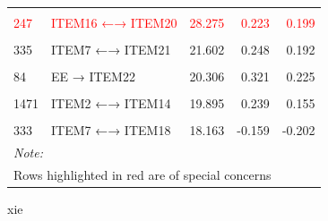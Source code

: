 \documentclass[
]{article}
\begin{document}
\begin{table}
\begin{tabular}[t]{llrrr}
\hspace{1em}\textcolor{red}{\cellcolor{gray!6}{339}} & \textcolor{red}{\cellcolor{gray!6}{ITEM9 ←→ ITEM19}} & \textcolor{red}{\cellcolor{gray!6}{42.687}} & \textcolor{red}{\cellcolor{gray!6}{0.351}} & \textcolor{red}{\cellcolor{gray!6}{0.355}}\\
\hspace{1em}\textcolor{red}{247} & \textcolor{red}{ITEM16 ←→ ITEM20} & \textcolor{red}{28.275} & \textcolor{red}{0.223} & \textcolor{red}{0.199}\\
\hspace{1em}\cellcolor{gray!6}{345} & \cellcolor{gray!6}{ITEM17 ←→ ITEM18} & \cellcolor{gray!6}{21.951} & \cellcolor{gray!6}{0.148} & \cellcolor{gray!6}{0.221}\\
\hspace{1em}335 & ITEM7 ←→ ITEM21 & 21.602 & 0.248 & 0.192\\
\hspace{1em}\cellcolor{gray!6}{346} & \cellcolor{gray!6}{ITEM17 ←→ ITEM19} & \cellcolor{gray!6}{20.837} & \cellcolor{gray!6}{-0.160} & \cellcolor{gray!6}{-0.218}\\
\hspace{1em}84 & EE → ITEM22 & 20.306 & 0.321 & 0.225\\
\hspace{1em}\cellcolor{gray!6}{981} & \cellcolor{gray!6}{DP → ITEM14} & \cellcolor{gray!6}{20.142} & \cellcolor{gray!6}{-0.404} & \cellcolor{gray!6}{-0.210}\\
\hspace{1em}1471 & ITEM2 ←→ ITEM14 & 19.895 & 0.239 & 0.155\\
\hspace{1em}\cellcolor{gray!6}{149} & \cellcolor{gray!6}{ITEM2 ←→ ITEM20} & \cellcolor{gray!6}{18.463} & \cellcolor{gray!6}{-0.164} & \cellcolor{gray!6}{-0.155}\\
\hspace{1em}333 & ITEM7 ←→ ITEM18 & 18.163 & -0.159 & -0.202\\
\bottomrule
\multicolumn{5}{l}{\rule{0pt}{1em}\textit{Note: }}\\
\multicolumn{5}{l}{\rule{0pt}{1em}Rows highlighted in red are of special concerns}\\
\end{tabular}
\end{table}

xie
\end{document}
